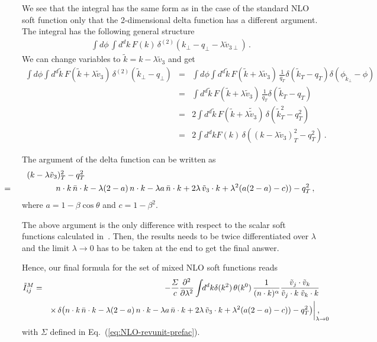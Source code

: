 \documentclass[a4paper,11pt]{report}
\numberwithin{equation}{section}
\newcommand{\mixed}{{M}}
\begin{document}
We see that the integral has the same form as in the case of the standard
NLO soft function only that the 2-dimensional delta function has a different
argument.
%
The integral has the following general structure
%
\begin{eqnarray}
  \int d\phi\, \int d^d k\, F(k)\,
  \delta^{(2)} (k_\perp-q_\perp-\lambda \tilde v_{3\perp})\,.
\end{eqnarray}
%
We can change variables to $\tilde k = k- \lambda \tilde v_3$ and get
%
\begin{eqnarray}
  \int\!\! d\phi \int d^d \tilde k\, F(\tilde k + \lambda \tilde v_3)\,
  \delta^{(2)} (\tilde k_\perp-q_\perp)
  & = & 
  \int\!\! d\phi \int d^d \tilde k\, F(\tilde k + \lambda \tilde v_3)\,
  \frac{1}{q_T}
  \delta (\tilde k_T-q_T)
  \delta (\phi_{\tilde k_\perp}-\phi)
  \nonumber \\
  & = & 
  \int d^d \tilde k\, F(\tilde k + \lambda \tilde v_3)\,
  \frac{1}{q_T}
  \delta (\tilde k_T-q_T)
  \nonumber \\
  & = & 
  2 \int d^d \tilde k\, F(\tilde k + \lambda \tilde \tilde v_3)\,
  \delta (\tilde k_T^2-q_T^2)
  \nonumber \\
  & = & 
  2 \int d^d k F(k)\,
  \delta ((k-\lambda \tilde v_3)_T^2-q_T^2)\,.
\end{eqnarray}

The argument of the delta function can be written as
%
\begin{eqnarray}
  (k-\lambda \tilde v_3)_T^2 - q_T^2
  & &
  \label{eq:lambda-dep-denominator}
  \\
  &\hspace{-100pt} = &
   \hspace{-45pt} 
  n \cdot k\, \nbar \cdot k
  - \lambda (2-a)\, n\cdot k - \lambda a\, \nbar \cdot k
  + 2 \lambda\, \tilde v_3 \cdot k 
  \nonumber %
  + \lambda^2 (a(2-a)-c)) - q_T^2\,,
\end{eqnarray}
%
where $a =  1-\beta \cos\theta$ and $c =  1-\beta^2$.

The above argument is the only difference with respect to the scalar soft
functions calculated in~\cite{Li:2013mia, AntoniaMTh}. Then, the results needs
to be twice differentiated over $\lambda$ and the limit $\lambda \to 0$ has to
be taken at the end to get the final answer.

Hence, our final formula for the set of mixed NLO soft functions reads
%
\begin{eqnarray}
  \tilde I_{ij}^\mixed
  & =  &
  - \frac{\Sigma}{c} \frac{\partial^2}{\partial \lambda^2}
  \int\!\! d^d k
  \delta(k^2)\, \theta(k^0)\,
  \frac{1}{(n\cdot k)^\alpha}
  \frac{\tilde v_j \cdot \tilde v_k}{\tilde v_j \cdot k\;\tilde  v_k \cdot k}
  \label{eq:mixed-final-formula}
  \\
  & &
  \times\,
  \delta \big(
  n \cdot k\, \nbar \cdot k
  - \lambda (2-a)\, n\cdot k - \lambda a\, \nbar \cdot k
  + 2 \lambda\, \tilde v_3 \cdot k 
  + \lambda^2 (a(2-a)-c)) - q_T^2\big)
  \bigg |_{\lambda \to 0} \hspace{-15pt},
  \nonumber
\end{eqnarray}
%
with $\Sigma$ defined in Eq.~(\ref{eq:NLO-revunit-prefac}).
\end{document}
